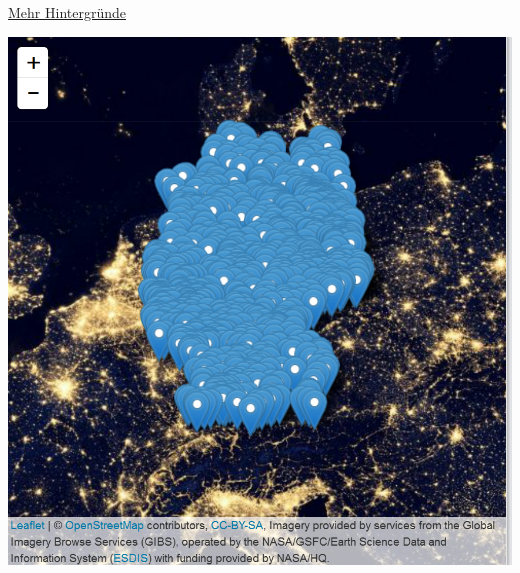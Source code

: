 \documentclass[ignorenonframetext,]{beamer}
\newenvironment{Shaded}{\begin{snugshade}}{\end{snugshade}}
\newcommand{\KeywordTok}[1]{\textcolor[rgb]{0.13,0.29,0.53}{\textbf{#1}}}
\newcommand{\NormalTok}[1]{#1}
\newcommand{\OperatorTok}[1]{\textcolor[rgb]{0.81,0.36,0.00}{\textbf{#1}}}
\newcommand{\StringTok}[1]{\textcolor[rgb]{0.31,0.60,0.02}{#1}}
\begin{document}
\begin{frame}[fragile]{\href{http://leaflet-extras.github.io/leaflet-providers/preview/index.html}{Mehr
Hintergründe}}
\protect\hypertarget{mehr-hintergrunde}{}

\begin{Shaded}
\end{Shaded}

\includegraphics{figure/LightsInteractive.PNG}

\end{frame}
\end{document}
